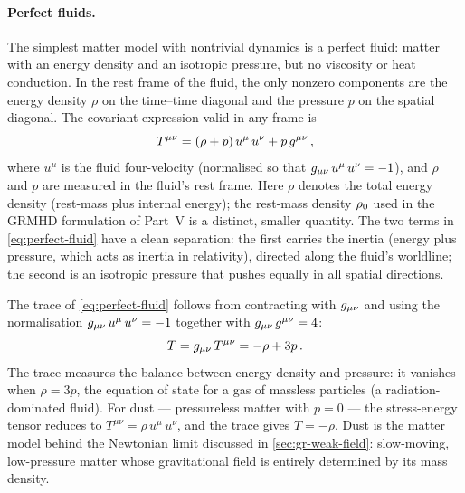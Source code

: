 \paragraph{Perfect fluids.}

The simplest matter model with nontrivial dynamics is a perfect fluid:
matter with an energy density and an isotropic pressure, but no viscosity
or heat conduction.  In the rest frame of the fluid, the only nonzero
components are the energy density $\rho$ on the time--time diagonal and
the pressure $p$ on the spatial diagonal.  The covariant expression valid
in any frame is
%
\begin{equation}
  T^{\mu\nu} = (\rho + p)\,u^\mu\, u^\nu + p\, g^{\mu\nu} \,,
  \label{eq:perfect-fluid}
\end{equation}
%
where $u^\mu$ is the fluid four-velocity (normalised so that
$g_{\mu\nu}\, u^\mu\, u^\nu = -1$), and $\rho$ and $p$ are measured in the
fluid's rest frame.  Here $\rho$ denotes the total energy density
(rest-mass plus internal energy); the rest-mass density $\rho_{0}$
used in the GRMHD formulation of Part~V is a distinct, smaller quantity.
The two terms in \cref{eq:perfect-fluid} have a clean separation: the
first carries the inertia (energy plus pressure, which acts as inertia in
relativity), directed along the fluid's worldline; the second is an
isotropic pressure that pushes equally in all spatial directions.

The trace of \cref{eq:perfect-fluid} follows from contracting with
$g_{\mu\nu}$ and using the normalisation $g_{\mu\nu}\,u^\mu\,u^\nu = -1$
together with $g_{\mu\nu}\,g^{\mu\nu} = 4$:
%
\begin{equation}
  T = g_{\mu\nu}\,T^{\mu\nu} = -\rho + 3p \,.
  \label{eq:perfect-fluid-trace}
\end{equation}
%
The trace measures the balance between energy density and pressure: it
vanishes when $\rho = 3p$, the equation of state for a gas of massless
particles (a radiation-dominated fluid).  For dust --- pressureless matter
with $p = 0$ --- the stress-energy tensor reduces to
$T^{\mu\nu} = \rho\,u^\mu\,u^\nu$, and the trace gives $T = -\rho$.
Dust is the matter model behind the Newtonian limit discussed in
\cref{sec:gr-weak-field}: slow-moving, low-pressure matter whose
gravitational field is entirely determined by its mass density.

